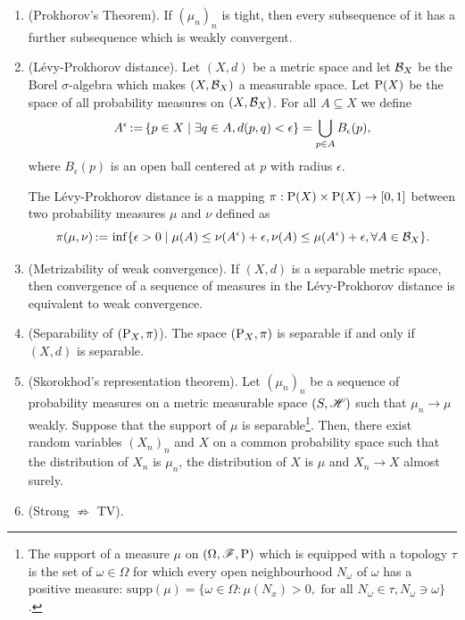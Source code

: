 \documentclass[a4paper,10pt]{scrbook}
\begin{document}
\begin{enumerate}
 \item (Prokhorov's Theorem). If $(\mu_n)_n$ is tight, then every subsequence of it has a further subsequence
       which is weakly convergent. 
       
 \item (L\'{e}vy-Prokhorov distance). Let $(X,d)$ be a metric space and let $\mathcal{B}_X$ be the Borel $\sigma$-algebra
       which makes $(X, \mathcal{B}_X)$ a measurable space. Let $\mathrm{P}(X)$ be the space of all probability measures on 
       $(X, \mathcal{B}_X)$. For all $A\subseteq X$ we define
       \[
        A^\epsilon {}\mathop{\mathrel{:}=}{} \{p \in X {}\mid{} \exists q\in A, d(p,q)<\epsilon\} = \bigcup_{p\in A} B_\epsilon(p),
       \]
       where $B_\epsilon(p)$ is an open ball centered at $p$ with radius $\epsilon$. 
       
       The L\'{e}vy-Prokhorov distance is a mapping $\pi:\mathrm{P}(X)\times \mathrm{P}(X)\to [0,1]$
       between two probability measures $\mu$ and $\nu$ defined as
       \[
        \pi(\mu,\nu) {}\mathop{\mathrel{:}=}{}  \inf\{\epsilon>0 {}\mid{} \mu(A) \leq \nu(A^\epsilon)+\epsilon, \nu(A) \leq \mu(A^\epsilon)+\epsilon, \forall A\in \mathcal{B}_X\}.
       \]

 \item (Metrizability of weak convergence). If $(X, d)$ is a separable metric space, then convergence of a sequence of measures in the 
       L\'{e}vy-Prokhorov distance is equivalent to weak convergence.
       
 \item (Separability of $(\mathrm{P}_X, \pi)$). The space $(\mathrm{P}_X, \pi)$ is separable if and only if $(X,d)$ is separable.
       
 \item (Skorokhod's representation theorem). Let $(\mu_n)_n$ be a sequence of probability measures on a metric measurable space $(S,\mathscr{H})$
       such that $\mu_n\to \mu$ weakly. Suppose that the support of $\mu$ is separable\footnote{The support of a measure $\mu$
       on $(\Omega,\mathscr{F},\mathrm{P})$ which is equipped with a topology $\tau$ is the set of $\omega\in\Omega$ for which every open 
       neighbourhood $N_{\omega}$ of $\omega$ has a positive measure:
       $\mathrm{supp}(\mu)=\{\omega\in\Omega: \mu(N_x)>0, \text{ for all } N_\omega\in \tau, N_\omega\ni \omega\}$.}.
       Then, there exist random variables $(X_n)_n$ and $X$ on a common probability space such that the distribution 
       of $X_n$ is $\mu_n$, the distribution of $X$ is $\mu$ and $X_n\to X$ almost surely.
        
 \item (Strong $\nRightarrow$ TV).
\end{enumerate}
\end{document}
